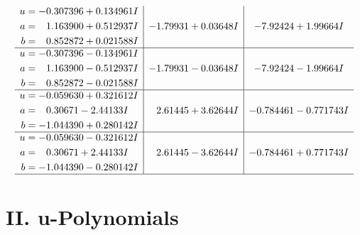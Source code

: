 \documentclass[1p]{elsarticle_modified}
\theoremstyle{definition}
\begin{document}
$$\begin{array}{c|c|c}
\begin{aligned}
u &= -0.307396 + 0.134961 I \\
a &= \phantom{-}1.163900 + 0.512937 I \\
b &= \phantom{-}0.852872 + 0.021588 I\end{aligned}
 & -1.79931 + 0.03648 I & -7.92424 + 1.99664 I \\ \hline\begin{aligned}
u &= -0.307396 - 0.134961 I \\
a &= \phantom{-}1.163900 - 0.512937 I \\
b &= \phantom{-}0.852872 - 0.021588 I\end{aligned}
 & -1.79931 - 0.03648 I & -7.92424 - 1.99664 I \\ \hline\begin{aligned}
u &= -0.059630 + 0.321612 I \\
a &= \phantom{-}0.30671 - 2.44133 I \\
b &= -1.044390 + 0.280142 I\end{aligned}
 & \phantom{-}2.61445 + 3.62644 I & -0.784461 - 0.771743 I \\ \hline\begin{aligned}
u &= -0.059630 - 0.321612 I \\
a &= \phantom{-}0.30671 + 2.44133 I \\
b &= -1.044390 - 0.280142 I\end{aligned}
 & \phantom{-}2.61445 - 3.62644 I & -0.784461 + 0.771743 I\\
 \hline 
 \end{array}$$\newpage
\newpage\renewcommand{\arraystretch}{1}
\centering \section*{ II. u-Polynomials}
\end{document}
